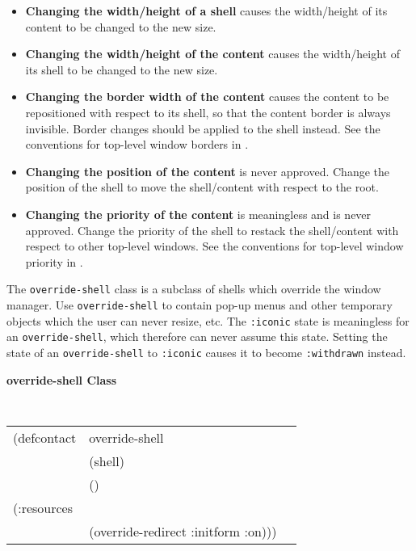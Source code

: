 \begin{itemize}
\item {\bf Changing the width/height of a shell} causes the width/height of its
content to be changed to the new size.

\item {\bf Changing the width/height of the content} causes the width/height of its
shell to be changed to the new size.

\item {\bf Changing the border width of the content} causes the content to be
repositioned with respect to its shell, so that the content border is always
invisible. Border changes should be applied to the shell instead. See the
conventions for top-level window borders in \cite{icccm}.

\item {\bf Changing the position of the content} is never approved. Change the
position of the shell to move the shell/content with respect to the root.

\item {\bf Changing the priority of the content} is meaningless and is never
approved.  Change the priority of the shell to restack the shell/content with
respect to other top-level windows.  See the conventions for top-level window
priority in \cite{icccm}.

\end{itemize}


The {\tt override-shell} class is a subclass of shells which override the window
manager.  Use {\tt override-shell} to contain pop-up menus and other temporary
objects which the user can never resize, etc.  The {\tt :iconic} state is
meaningless for an {\tt override-shell}, which therefore can never assume this
state.  Setting the state of an {\tt override-shell} to {\tt :iconic} causes it
to become {\tt :withdrawn} instead.

{\samepage 
{\large {\bf override-shell \hfill Class}} 
\begin{flushright} \parbox[t]{6.125in}{
\tt
\begin{tabular}{lll}
\raggedright
(defcontact &override-shell\\
&  (shell)\\
&  () \\
(:resources \\
&    (override-redirect :initform :on))) 									     
\end{tabular}
\rm
}\end{flushright}}




